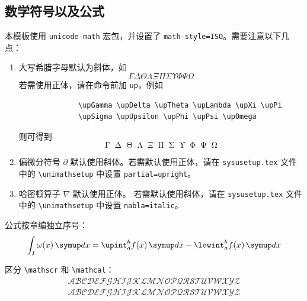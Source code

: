 \subsection{数学符号以及公式}

本模板使用 \verb|unicode-math| 宏包，并设置了 \verb|math-style=ISO|。需要注意以下几点：

\begin{enumerate}
    \item 大写希腊字母默认为斜体，如
          \begin{equation*}
              \Gamma \Delta \Theta \Lambda \Xi \Pi \Sigma \Upsilon \Phi \Psi \Omega
          \end{equation*}
          若需使用正体，请在命令前加 \verb|up|，例如
          \begin{verbatim}
              \upGamma \upDelta \upTheta \upLambda \upXi \upPi
              \upSigma \upUpsilon \upPhi \upPsi \upOmega
          \end{verbatim}
          则可得到
          \begin{equation*}
              \upGamma \upDelta \upTheta \upLambda \upXi \upPi \upSigma \upUpsilon \upPhi \upPsi \upOmega
          \end{equation*}
    \item 偏微分符号 $\partial$ 默认使用斜体。若需默认使用正体，请在 \texttt{sysusetup.tex} 文件中的 \verb|\unimathsetup| 中设置 \verb|partial=upright|。
    \item 哈密顿算子 $\nabla$ 默认使用正体。
          若需默认使用斜体，请在 \texttt{sysusetup.tex} 文件中的 \verb|\unimathsetup| 中设置 \verb|nabla=italic|。
\end{enumerate}

公式按章编独立序号：
\begin{equation}
    \int_I \omega(x)\diff x = \upint_{a}^b f(x)\diff x - \lowint_a^b f(x)\diff x
\end{equation}

区分 \verb|\mathscr| 和 \verb|\mathcal|：
\begin{gather*}
    \mathscr{A} \mathscr{B} \mathscr{C} \mathscr{D} \mathscr{E} \mathscr{F} \mathscr{G} \mathscr{H} \mathscr{I} \mathscr{J} \mathscr{K} \mathscr{L} \mathscr{M} \mathscr{N} \mathscr{O} \mathscr{P} \mathscr{Q} \mathscr{R} \mathscr{S} \mathscr{T} \mathscr{U} \mathscr{V} \mathscr{W} \mathscr{X} \mathscr{Y} \mathscr{Z}\\
    \mathcal{A} \mathcal{B} \mathcal{C} \mathcal{D} \mathcal{E} \mathcal{F} \mathcal{G} \mathcal{H} \mathcal{I} \mathcal{J} \mathcal{K} \mathcal{L} \mathcal{M} \mathcal{N} \mathcal{O} \mathcal{P} \mathcal{Q} \mathcal{R} \mathcal{S} \mathcal{T} \mathcal{U} \mathcal{V} \mathcal{W} \mathcal{X} \mathcal{Y} \mathcal{Z}
\end{gather*}

